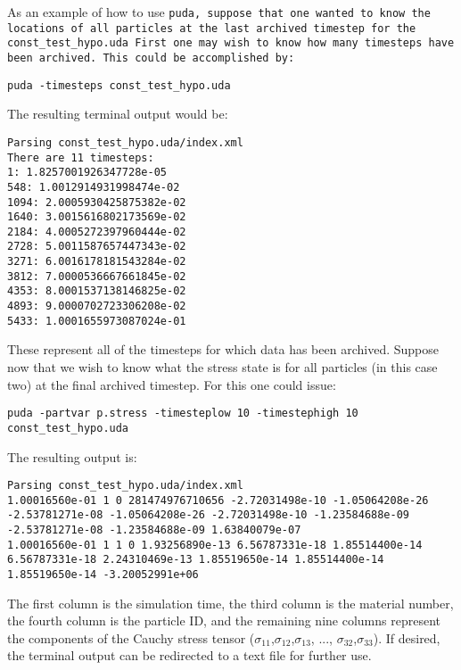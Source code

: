 As an example of how to use \tt puda, \normalfont suppose that one
wanted to know the locations of all particles at the last archived
timestep for the \tt const\_test\_hypo.uda \normalfont First one may
wish to know how many timesteps have been archived.  This could be
accomplished by:

\begin{Verbatim}[fontsize=\footnotesize]
 puda -timesteps const_test_hypo.uda
\end{Verbatim}
The resulting terminal output would be:
\begin{Verbatim}[fontsize=\footnotesize]
Parsing const_test_hypo.uda/index.xml
There are 11 timesteps:
1: 1.8257001926347728e-05
548: 1.0012914931998474e-02
1094: 2.0005930425875382e-02
1640: 3.0015616802173569e-02
2184: 4.0005272397960444e-02
2728: 5.0011587657447343e-02
3271: 6.0016178181543284e-02
3812: 7.0000536667661845e-02
4353: 8.0001537138146825e-02
4893: 9.0000702723306208e-02
5433: 1.0001655973087024e-01
\end{Verbatim}

These represent all of the timesteps for which data has been archived.
Suppose now that we wish to know what the stress state is for all
particles (in this case two) at the final archived timestep.  For this
one could issue:

\begin{Verbatim}[fontsize=\footnotesize]
puda -partvar p.stress -timesteplow 10 -timestephigh 10 const_test_hypo.uda
\end{Verbatim}

The resulting output is:

\begin{Verbatim}[fontsize=\footnotesize]
Parsing const_test_hypo.uda/index.xml
1.00016560e-01 1 0 281474976710656 -2.72031498e-10 -1.05064208e-26 -2.53781271e-08 -1.05064208e-26 -2.72031498e-10 -1.23584688e-09 -2.53781271e-08 -1.23584688e-09 1.63840079e-07
1.00016560e-01 1 1 0 1.93256890e-13 6.56787331e-18 1.85514400e-14 6.56787331e-18 2.24310469e-13 1.85519650e-14 1.85514400e-14 1.85519650e-14 -3.20052991e+06
\end{Verbatim}

The first column is the simulation time, the third column is the
material number, the fourth column is the particle ID, and the
remaining nine columns represent the components of the Cauchy stress
tensor ($ \sigma_{11}$,$\sigma_{12}$,$\sigma_{13}$, ...,
$\sigma_{32}$,$\sigma_{33}$).  If desired, the terminal output can be
redirected to a text file for further use.

